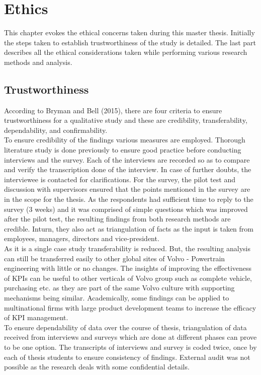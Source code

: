 \chapter{Ethics}

This chapter evokes the ethical concerns taken during this master thesis. Initially the steps taken to establish trustworthiness of the study is detailed. The last part describes all the ethical considerations taken while performing various research methods and analysis.

\section{Trustworthiness}
According to Bryman and Bell (2015), there are four criteria to ensure trustworthiness for a qualitative study and these are credibility, transferability, dependability, and confirmability. \\ 

To ensure credibility of the findings various measures are employed. Thorough literature study is done previously to ensure good practice before conducting interviews and the survey. Each of the interviews are recorded so as to compare and verify the transcription done of the interview. In case of further doubts, the interviewee is contacted for clarifications. For the survey, the pilot test and discussion with supervisors ensured that the points mentioned in the survey are in the scope for the thesis. As the respondents had sufficient time to reply to the survey (3 weeks) and it was comprised of simple questions which was improved after the pilot test, the resulting findings from both research methods are credible. Inturn, they also act as triangulation of facts as the input is taken from employees, managers, directors and vice-president.\\

As it is a single case study transferability is reduced. But, the resulting analysis can still be transferred easily to other global sites of Volvo - Powertrain engineering with little or no changes. The insights of improving the effectiveness of KPIs can be useful to other verticals of Volvo group such as complete vehicle, purchasing etc. as they are part of the same Volvo culture with supporting mechanisms being similar. Academically, some findings can be applied to multinational firms with large product development teams to increase the efficacy of KPI management.\\

To ensure dependability of data over the course of thesis, triangulation of data received from interviews and surveys which are done at different phases can prove to be one option. The transcripts of interviews and survey is coded twice, once by each of thesis students to ensure consistency of findings. External audit was not possible as the research deals with some confidential details.\\


